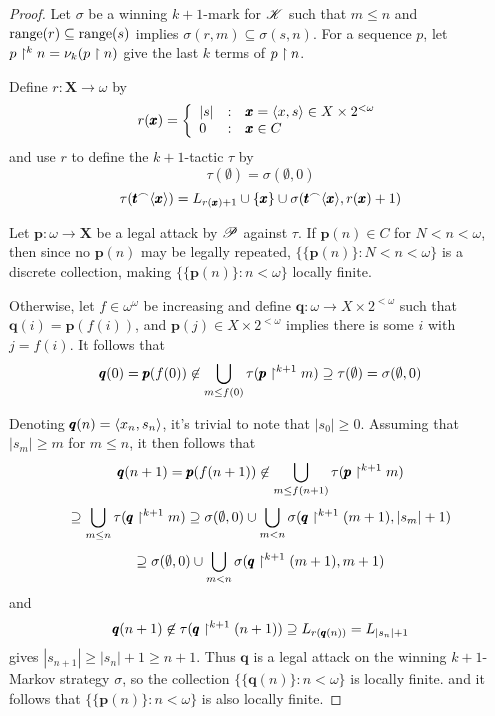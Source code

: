 \begin{proof}
  Let $\sigma$ be a winning $k+1$-mark for $\mathscr{K}$ such that $m\leq n$ and
  $\text{range}(r) \subseteq \text{range}(s)$ implies $\sigma(r,m)\subseteq\sigma(s,n)$.
  For a sequence $p$, let $p\restriction^k n=\nu_k(p\restriction n)$ give the last $k$
  terms of $p\restriction n$.

  Define $r:\pmb X\to\omega$ by
    \[
      r(\pmb x)
        =
      \left\{
        \begin{array}{lcl}
          |s|
        & : &
          \pmb x = \langle x,s\rangle \in X\times 2^{<\omega}
        \\
          0
        & : &
          \pmb x \in C
        \end{array}
      \right.
    \]
  and use $r$ to define the $k+1$-tactic $\tau$ by
    \[
      \tau(\emptyset)
        =
      \sigma(\emptyset,0)
    \]
    \[
      \tau(\pmb t{^\frown}\langle\pmb x\rangle)
        =
      L_{r(\pmb x)+1}
        \cup
      \{\pmb x\}
        \cup
      \sigma(\pmb t{^\frown}\langle\pmb x\rangle,r(\pmb x)+1)
    \]

  Let $\pmb p:\omega\to\pmb X$ be a legal attack by $\mathscr{P}$ against $\tau$.
  If $\pmb p(n)\in C$ for $N<n<\omega$, then since no $\pmb p(n)$ may be legally
  repeated, $\{\{\pmb p(n)\}:N<n<\omega\}$ is a discrete collection, making
  $\{\{\pmb p(n)\}:n<\omega\}$ locally finite.

  Otherwise, let $f\in\omega^\omega$ be increasing and define
  $\pmb q:\omega\to X\times 2^{<\omega}$ such that $\pmb q(i)=\pmb p(f(i))$,
  and $\pmb p(j)\in X\times 2^{<\omega}$ implies there is some $i$ with $j=f(i)$.
  It follows that
    \[
      \pmb q(0)
        =
      \pmb p(f(0))
        \not\in
      \bigcup_{m\leq f(0)}\tau(\pmb p \restriction^{k+1} m)
        \supseteq
      \tau(\emptyset)
        =
      \sigma(\emptyset,0)
    \]

  Denoting $\pmb q(n)=\langle x_n,s_n\rangle$, it's trivial to note that $|s_0|\geq 0$.
  Assuming that $|s_m|\geq m$ for $m\leq n$,
  it then follows that
    \[
      \pmb q(n+1)
        =
      \pmb p(f(n+1))
        \not\in
      \bigcup_{m\leq f(n+1)}\tau(\pmb p\restriction^{k+1} m)
    \]
    \[
        \supseteq
      \bigcup_{m\leq n}\tau(\pmb q\restriction^{k+1} m)
        \supseteq
      \sigma(\emptyset,0)
        \cup
      \bigcup_{m < n}\sigma(\pmb q\restriction^{k+1} (m+1),|s_m|+1)
    \]
    \[
        \supseteq
      \sigma(\emptyset,0)
        \cup
      \bigcup_{m < n}\sigma(\pmb q\restriction^{k+1} (m+1),m+1)
    \]
  and
    \[
      \pmb q(n+1)
        \not\in
      \tau(\pmb q\restriction^{k+1} (n+1))
        \supseteq
      L_{r(\pmb q(n))}
        =
      L_{|s_n|+1}
    \]
  gives $|s_{n+1}|\geq|s_n|+1\geq n+1$.
  Thus $\pmb q$ is a legal attack on the winning $k+1$-Markov strategy
  $\sigma$, so the collection $\{\{\pmb q(n)\}:n<\omega\}$ is locally finite.
  and it follows that $\{\{\pmb p(n)\}:n<\omega\}$ is also locally finite.
\end{proof}

